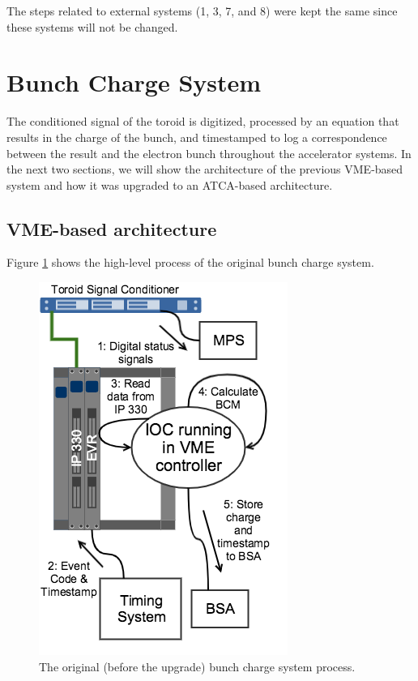 \documentclass[letter,
        biblatex,   %
        keeplastbox,  %
        ]{jacow}
\begin{document}
The steps related to external systems (1, 3, 7, and 8) were kept the same since these systems will not be changed.

\section{Bunch Charge System}
The conditioned signal of the toroid is digitized, processed by an equation that results in the charge of the bunch, and timestamped to log a correspondence between the result and the electron bunch throughout the accelerator systems. In the next two sections, we will show the architecture of the previous VME-based system and how it was upgraded to an ATCA-based architecture.

\subsection{VME-based architecture}
Figure \ref{fig:bcm_vme} shows the high-level process of the original bunch charge system.

\begin{figure}[!htb]
  \centering
  \includegraphics*[width=.8\columnwidth]{BCM_VME_Process}
  \caption{The original (before the upgrade) bunch charge system process.}
  \label{fig:bcm_vme}
\end{figure}
\end{document}
